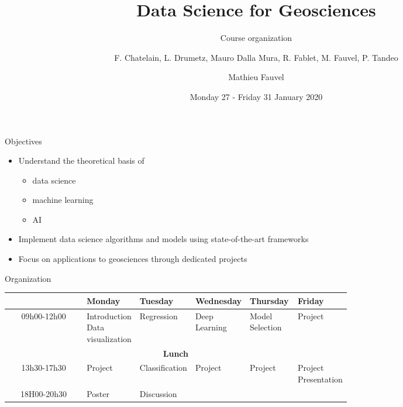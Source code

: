 \documentclass[pressentation,10pt,aspectratio=1610, xcolor=table]{beamer}
\author{F. Chatelain, L. Drumetz, Mauro Dalla Mura, R. Fablet, M. Fauvel, P. Tandeo}
\date{Monday 27 - Friday 31 January 2020}
\title{Data Science for Geosciences}
\subtitle{Course organization}
\author[Mathieu Fauvel]{Mathieu Fauvel}
\begin{document}
\maketitle

\begin{frame}[label={sec:orged1a1cd}]{Objectives}
\begin{itemize}
\item Understand the theoretical basis of 
\begin{itemize}
\item data science
\item machine learning
\item AI
\end{itemize}
\item Implement data science algorithms and models using state-of-the-art frameworks
\item Focus on applications to geosciences through dedicated projects
\end{itemize}
\end{frame}

\begin{frame}[label={sec:orgb005435}]{Organization}
\footnotesize
\begin{center}
\begin{tabular}{cp{0.15\linewidth}p{0.13\linewidth}p{0.13\linewidth}p{0.14\linewidth}p{0.13\linewidth}}
\toprule
 & Monday & Tuesday & Wednesday & Thursday & Friday\\
\midrule
09h00-12h00 & Introduction \newline Data visualization & Regression & Deep Learning & Model Selection & Project\\
\midrule
\multicolumn{6}{c}{\bf Lunch}\\
\midrule
13h30-17h30 & Project & Classification & Project & Project & Project \newline Presentation\\
\midrule
18H00-20h30 & Poster & Discussion &  &  & \\
\bottomrule
\end{tabular}
\end{center}
\normalfont
\end{frame}
\end{document}

